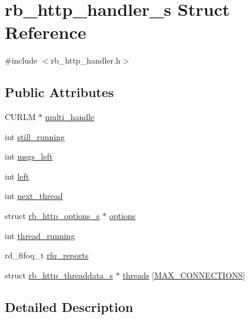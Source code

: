 \hypertarget{structrb__http__handler__s}{}\section{rb\+\_\+http\+\_\+handler\+\_\+s Struct Reference}
\label{structrb__http__handler__s}


{\ttfamily \#include $<$rb\+\_\+http\+\_\+handler.\+h$>$}

\subsection*{Public Attributes}
\begin{DoxyCompactItemize}
\item 
C\+U\+R\+L\+M $\ast$ \hyperlink{structrb__http__handler__s_a45c0ce1f2e4d154d0194bb60569c0faf}{multi\+\_\+handle}
\item 
int \hyperlink{structrb__http__handler__s_aa49e97bedda03106912088dad0b75e64}{still\+\_\+running}
\item 
int \hyperlink{structrb__http__handler__s_a803db851c00a617f8a80f00f29d9dba3}{msgs\+\_\+left}
\item 
int \hyperlink{structrb__http__handler__s_a6239490836609d286669af640028ae71}{left}
\item 
int \hyperlink{structrb__http__handler__s_a708aed2b081f33ba413edbb62eb8959f}{next\+\_\+thread}
\item 
struct \hyperlink{structrb__http__options__s}{rb\+\_\+http\+\_\+options\+\_\+s} $\ast$ \hyperlink{structrb__http__handler__s_a4297d05275e5a3b8247329902f7835ee}{options}
\item 
int \hyperlink{structrb__http__handler__s_a978656c7c89a80d411121107c97a0dcd}{thread\+\_\+running}
\item 
rd\+\_\+fifoq\+\_\+t \hyperlink{structrb__http__handler__s_a383f2047cfcdd9fe49d0deacf770a73c}{rfq\+\_\+reports}
\item 
struct \hyperlink{structrb__http__threaddata__s}{rb\+\_\+http\+\_\+threaddata\+\_\+s} $\ast$ \hyperlink{structrb__http__handler__s_a6ccfd1d592021f903fc8fd4331ee1a46}{threads} \mbox{[}\hyperlink{rb__http__handler_8h_a053b7859476cc9867ec62c49e68d3fa1}{M\+A\+X\+\_\+\+C\+O\+N\+N\+E\+C\+T\+I\+O\+N\+S}\mbox{]}
\end{DoxyCompactItemize}


\subsection{Detailed Description}


